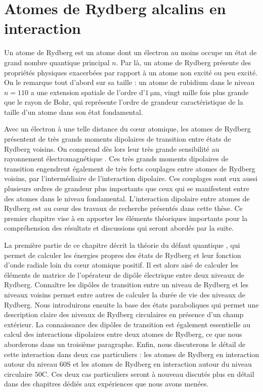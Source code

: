\chapter{Atomes de Rydberg alcalins en interaction}
\label{chapter:Rydberg}

Un atome de Rydberg est un atome dont un électron au moins occupe un état de grand nombre quantique principal $n$.
Par là, un atome de Rydberg présente des propriétés physiques exacerbées par rapport à un atome non excité ou peu excité.
On le remarque tout d'abord sur sa taille : un atome de rubidium dans le niveau $n=110$ a une extension spatiale de l'ordre d'$1 ~\si{\micro\meter}$, vingt mille fois plus grande que le rayon de Bohr, qui représente l'ordre de grandeur caractéristique de la taille d'un atome dans son état fondamental.

Avec un électron à une telle distance du c\oe ur atomique, les atomes de Rydberg présentent de très grands moments dipolaires de transition entre états de Rydberg voisins. On comprend dès lors leur très grande sensibilité au rayonnement électromagnétique \cite{ENS_ENHANCED}.
Ces très grands moments dipolaires de transition engendrent également de très forts couplages entre atomes de Rydberg voisins, par l'intermédiaire de l'interaction dipolaire. Ces couplages sont eux aussi plusieurs ordres de grandeur plus importants que ceux qui se manifestent entre des atomes dans le niveau fondamental.
L'interaction dipolaire entre atomes de Rydberg est au c\oe ur des travaux de recherche présentés dans cette thèse. Ce premier chapitre vise à en apporter les éléments théoriques importants pour la compréhension des résultats et discussions qui seront abordés par la suite.

La première partie de ce chapitre décrit la théorie du défaut quantique \cite{TXT_GALLAGHER}, qui permet de calculer les énergies propres des états de Rydberg et leur fonction d'onde radiale loin du c\oe ur atomique positif.
Il est alors aisé de calculer les éléments de matrice de l'opérateur de dipôle électrique entre deux niveaux de Rydberg.
Connaître les dipôles de transition entre un niveau de Rydberg et les niveaux voisins permet entre autres de calculer la durée de vie des niveaux de Rydberg.
Nous introduirons ensuite la base des états paraboliques qui permet une description claire des niveaux de Rydberg circulaires en présence d'un champ extérieur.
La connaissance des dipôles de transition est également essentielle au calcul des interactions dipolaires entre deux atomes de Rydberg, ce que nous aborderons dans un troisième paragraphe.
Enfin, nous discuterons le détail de cette interaction dans deux cas particuliers  : les atomes de Rydberg en interaction autour du niveau $60$S et les atomes de Rydberg en interaction autour du niveau circulaire $50$C.
Ces deux cas particuliers seront à nouveau discutés plus en détail dans des chapitres dédiés aux expériences que nous avons menées.

